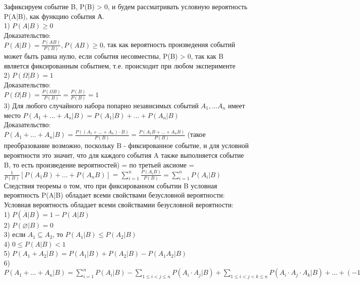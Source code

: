 Зафиксируем событие B, P(B) > 0, и будем рассматривать условную вероятность P(A|B), как функцию события А.\\

1) $P(A|B) \geqslant 0$\\
Доказательство:\\
$P(A|B) = \frac{P(AB)}{P(B)}, P(AB) \geqslant 0$, так как вероятность произведения событий может быть равна нулю, если события несовместны, P(B) > 0, так как B является фиксированным событием, т.е. происходит при любом эксперименте\\
2) $P(\Omega|B) = 1$\\
Доказательство:\\
$P(\Omega|B) = \frac{P(\Omega B)}{P(B)} = \frac{P(B)}{P(B)} = 1$\\
3) Для любого случайного набора попарно независимых событий $A_{1}, ... A_{n}$ имеет место $P(A_{1} + ... + A_{n} | B) = P(A_{1} | B) + ... + P(A_{n} | B)$\\
Доказательство:\\
$P(A_{1} + ... + A_{n} | B) = \frac{P((A_{1} + ... + A_{n}) \cdot B)}{P(B)} = \frac{P(A_{1}B + ... + A_{n}B)}{P(B)} $ (такое преобразование возможно, поскольку B - фиксированное событие, и для условной вероятности это значит, что для каждого события A также выполняется событие B, то есть произведение вероятностей) = по третьей аксиоме = $ \frac{1}{P(B)} [P(A_{1}B) + ... + P(A_{n}B)] $ = $\sum\limits^{n}_{i=1} \frac{P(A_{i}B)}{P(B)} =  \sum\limits^{n}_{i=1} P(A_{i}|B)$\\

Следствия теоремы о том, что при фиксированном событии B условная вероятность P(A|B) обладает всеми свойствами безусловной вероятности:\\
Условная вероятность обладает всеми свойствамии безусловной вероятности:\\
1) $P(\overline{A}|B) = 1 - P(A|B)$\\
2) $P(\varnothing|B) = 0$\\
3) если $A_{1} \subseteq A_{2}$, то $P(A_{1}|B) \leqslant P(A_{2}|B)$\\
4) $0 \leqslant P(A|B) < 1$\\
5) $P(A_{1} + A_{2}|B) = P(A_{1}|B) + P(A_{2}|B) - P(A_{1} A_{2} | B)$\\
6) $P(A_{1} + ... + A_{n}|B) =  \sum\limits_{i=1}^{n} P(A_{i}|B) - \sum\limits_{1 \leqslant i < j \leqslant n} P(A_{i} \cdot A_{j}|B) + \sum\limits_{1 \leqslant i < j < k \leqslant n} P(A_{i} \cdot A_{j} \cdot A_{k}|B) + ... + (-1)^{n + 1} P(A_{i} \cdot ... \cdot A_{n}|B)$\\

